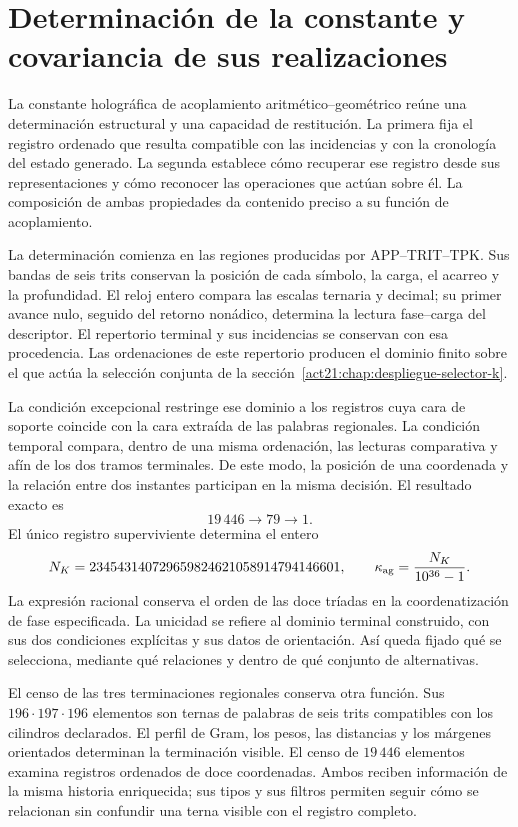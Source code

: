 \section{Determinación de la constante y covariancia de sus realizaciones}
\label{act21:centralidad-constante}

La constante holográfica de acoplamiento aritmético--geométrico reúne una
determinación estructural y una capacidad de restitución. La primera fija
el registro ordenado que resulta compatible con las incidencias y con la
cronología del estado generado. La segunda establece cómo recuperar ese
registro desde sus representaciones y cómo reconocer las operaciones que
actúan sobre él. La composición de ambas propiedades da contenido preciso
a su función de acoplamiento.

La determinación comienza en las regiones producidas por APP--TRIT--TPK.
Sus bandas de seis trits conservan la posición de cada símbolo, la carga,
el acarreo y la profundidad. El reloj entero compara las escalas ternaria
y decimal; su primer avance nulo, seguido del retorno nonádico, determina
la lectura fase--carga del descriptor. El repertorio terminal y sus
incidencias se conservan con esa procedencia. Las ordenaciones de este
repertorio producen el dominio finito sobre el que actúa la selección
conjunta de la sección~\ref{act21:chap:despliegue-selector-k}.

La condición excepcional restringe ese dominio a los registros cuya cara
de soporte coincide con la cara extraída de las palabras regionales. La
condición temporal compara, dentro de una misma ordenación, las lecturas
comparativa y afín de los dos tramos terminales. De este modo, la posición
de una coordenada y la relación entre dos instantes participan en la misma
decisión. El resultado exacto es
\[
 19\,446\longrightarrow79\longrightarrow1.
\]
El único registro superviviente determina el entero
\[
 N_K=234543140729659824621058914794146601,
 \qquad
 \kappa_{\rm ag}=\frac{N_K}{10^{36}-1}.
\]
La expresión racional conserva el orden de las doce tríadas en la coordenatización
de fase especificada. La unicidad se refiere al dominio terminal
construido, con sus dos condiciones explícitas y sus datos de orientación.
Así queda fijado qué se selecciona, mediante qué relaciones y dentro de
qué conjunto de alternativas.

El censo de las tres terminaciones regionales conserva otra función.
Sus \(196\cdot197\cdot196\) elementos son ternas de palabras de seis
trits compatibles con los cilindros declarados. El perfil de Gram, los
pesos, las distancias y los márgenes orientados determinan la terminación
visible. El censo de \(19\,446\) elementos examina registros ordenados de
doce coordenadas. Ambos reciben información de la misma historia
enriquecida; sus tipos y sus filtros permiten seguir cómo se relacionan
sin confundir una terna visible con el registro completo.

